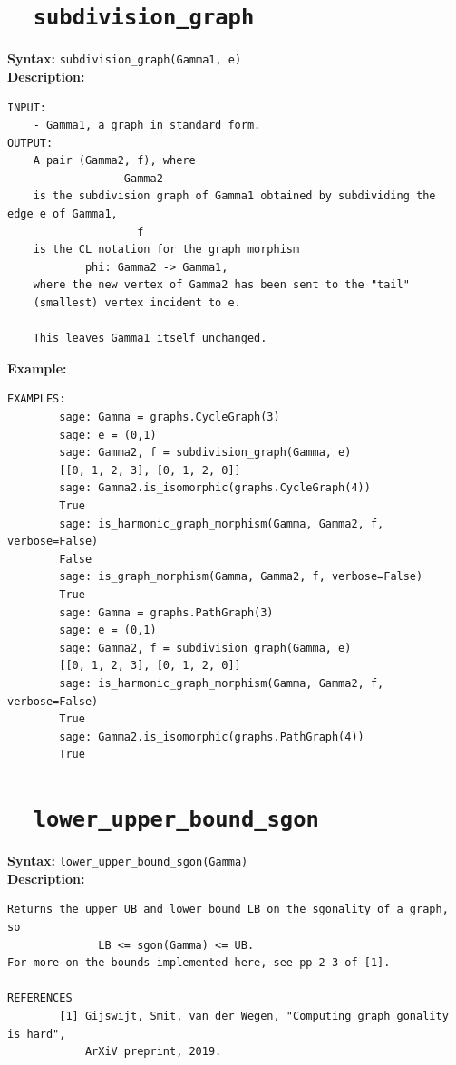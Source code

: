 \documentclass{article}
\begin{document}
\section{\tt \ \ subdivision\_graph}

\textbf{Syntax:} \verb}subdivision_graph(Gamma1, e)}\\

\textbf{Description:}
\begin{verbatim}
INPUT:
    - Gamma1, a graph in standard form.
OUTPUT:
    A pair (Gamma2, f), where
                  Gamma2
    is the subdivision graph of Gamma1 obtained by subdividing the edge e of Gamma1, 
                    f
    is the CL notation for the graph morphism
            phi: Gamma2 -> Gamma1,
    where the new vertex of Gamma2 has been sent to the "tail"
    (smallest) vertex incident to e. 
    
    This leaves Gamma1 itself unchanged. 
\end{verbatim}

\textbf{Example:}
\begin{verbatim}
EXAMPLES:
        sage: Gamma = graphs.CycleGraph(3)
        sage: e = (0,1)
        sage: Gamma2, f = subdivision_graph(Gamma, e)
        [[0, 1, 2, 3], [0, 1, 2, 0]]
        sage: Gamma2.is_isomorphic(graphs.CycleGraph(4))
        True
        sage: is_harmonic_graph_morphism(Gamma, Gamma2, f, verbose=False)
        False
        sage: is_graph_morphism(Gamma, Gamma2, f, verbose=False)
        True
        sage: Gamma = graphs.PathGraph(3)
        sage: e = (0,1)
        sage: Gamma2, f = subdivision_graph(Gamma, e)
        [[0, 1, 2, 3], [0, 1, 2, 0]]
        sage: is_harmonic_graph_morphism(Gamma, Gamma2, f, verbose=False)
        True
        sage: Gamma2.is_isomorphic(graphs.PathGraph(4))
        True
\end{verbatim}

\section{\tt \ \ lower\_upper\_bound\_sgon}

\textbf{Syntax:} \verb}lower_upper_bound_sgon(Gamma)}\\

\textbf{Description:}
\begin{verbatim}
Returns the upper UB and lower bound LB on the sgonality of a graph, so
              LB <= sgon(Gamma) <= UB.
For more on the bounds implemented here, see pp 2-3 of [1].

REFERENCES
        [1] Gijswijt, Smit, van der Wegen, "Computing graph gonality is hard", 
            ArXiV preprint, 2019.

\end{verbatim}
\end{document}
